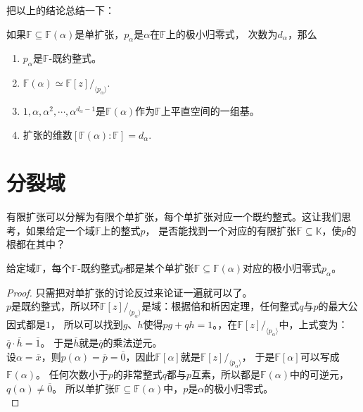 \documentclass[12pt,UTF8]{ctexbook}
\begin{document}
\begin{appendix}
把以上的结论总结一下：
\begin{pp}\label{pp:9_3}
    如果$\mathbb{F} \subseteq \mathbb{F}(\alpha)$是单扩张，$p_\alpha$是$\alpha$在$\mathbb{F}$上的极小归零式，
    次数为$d_{\alpha}$，那么
    \begin{enumerate}
        \item $p_\alpha$是$\mathbb{F}$-既约整式。
        \item $ \mathbb{F}(\alpha) \simeq \mathbb{F}[z] /_{\langle p_\alpha \rangle}.$
        \item $1, \alpha, \alpha^2, \cdots , \alpha^{d_{\alpha}-1}$是$\mathbb{F}(\alpha)$作为$\mathbb{F}$上平直空间的一组基。
        \item 扩张的维数$[\mathbb{F}(\alpha) : \mathbb{F}] = d_{\alpha}.$
    \end{enumerate}
\end{pp}

\section{分裂域}
有限扩张可以分解为有限个单扩张，每个单扩张对应一个既约整式。这让我们思考，如果给定一个域$\mathbb{F}$上的整式$p$，
是否能找到一个对应的有限扩张$\mathbb{F} \subseteq \mathbb{K}$，使$p$的根都在其中？

\begin{pp}\label{pp:9_4}
    给定域$\mathbb{F}$，每个$\mathbb{F}$-既约整式$p$都是某个单扩张$\mathbb{F} \subseteq \mathbb{F}(\alpha)$对应的极小归零式$p_\alpha$。
\end{pp}
\begin{proof} %
    只需把对单扩张的讨论反过来论证一遍就可以了。\\
    $p$是既约整式，所以环$\mathbb{F}[z] /_{\langle p_\alpha \rangle}$是域：根据倍和析因定理，任何整式$q$与$p$的最大公因式都是$1$，
    所以可以找到$g$、$h$使得$pg + qh = 1$。，在$\mathbb{F}[z] /_{\langle p_\alpha \rangle}$中，上式变为：$\overline{q}\cdot\overline{h} = \overline{1}$。
    于是$\overline{h}$就是$\overline{q}$的乘法逆元。\\
    设$\alpha = \overline{x}$，则$p(\alpha) = \overline{p} = \overline{0}$，因此$\mathbb{F}[\alpha]$就是$\mathbb{F}[z] /_{\langle p_\alpha \rangle}$，
    于是$\mathbb{F}[\alpha]$可以写成$\mathbb{F}(\alpha)$。
    任何次数小于$p$的非常整式$q$都与$p$互素，所以都是$\mathbb{F}(\alpha)$中的可逆元，$q(\alpha) \neq \overline{0}$。
    所以单扩张$\mathbb{F} \subseteq \mathbb{F}(\alpha)$中，$p$是$\alpha$的极小归零式。\\
\end{proof}


\end{appendix}
\end{document}
